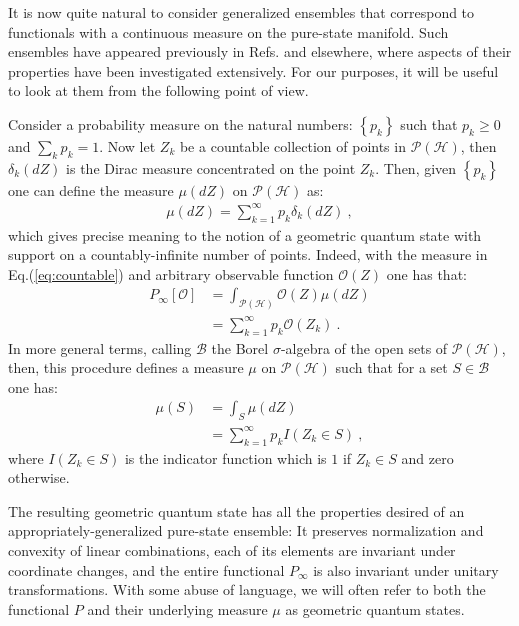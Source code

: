 \documentclass[draft,nofootinbib,pre,twocolumn,showpacs,showkeys,groupaddress,preprintnumbers,floatfix]{revtex4-1}
\newcommand{\1}{\mathbbm{1}}
\newcommand{\PH}{\mathcal{P}(\mathcal{H})}
\begin{document}
It is now quite natural to consider generalized ensembles that correspond to
functionals with a continuous measure on the pure-state manifold. Such ensembles have 
appeared previously in Refs. \cite{Brody2001,Brody2007,Brody1998,Brody2016} and elsewhere, 
where aspects of their properties have been investigated extensively. For our purposes, it will
be useful to look at them from the following point of view.

Consider a probability measure on the natural numbers: $\left\{p_k\right\}$
such that $p_k \geq 0$ and $\sum_k p_k = 1$. Now let $Z_k$ be a countable
collection of points in $\mathcal{P}(\mathcal{H})$, then $\delta_k(dZ)$ is the
Dirac measure concentrated on the point $Z_k$. Then, given $\left\{
p_k\right\}$ one can define the measure $\mu(dZ)$ on $\mathcal{P}(\mathcal{H})$
as:
\begin{align}
\mu(dZ) = \sum_{k=1}^{\infty} p_k \delta_k(dZ) \label{eq:countable}
  ~,
\end{align}
which gives precise meaning to the notion of a geometric quantum state with
support on a countably-infinite number of points. Indeed, with the measure in
Eq.(\ref{eq:countable}) and arbitrary observable function $\mathcal{O}(Z)$ one
has that:
\begin{align*}
P_{\infty}[\mathcal{O} ]
  & = \int_{\PH} \!\!\!\!\!\!\!\!\! \mathcal{O}(Z) \mu(dZ) \\
  & = \sum_{k=1}^{\infty} p_k \mathcal{O}(Z_k) 
  ~.
\end{align*}
In more general terms, calling $\mathcal{B}$ the Borel $\sigma$-algebra of the
open sets of $\PH$, then, this procedure defines a measure $\mu$ on $\PH$ such
that for a set $S \in \mathcal{B}$ one has:
\begin{align*}
\mu(S) & = \int_{S} \mu(dZ) \\
  & =  \sum_{k=1}^{\infty} p_k I(Z_k \in S)
  ~,
\end{align*}
where $I(Z_k \in S)$ is the indicator function which is $1$ if $Z_k \in S$ and
zero otherwise.

The resulting geometric quantum state has all the properties desired of an
appropriately-generalized pure-state ensemble: It preserves normalization and
convexity of linear combinations, each of its elements are invariant under
coordinate changes, and the entire functional $P_\infty$ is also invariant
under unitary transformations. With some abuse of language, we will often refer
to both the functional $P$ and their underlying measure $\mu$ as geometric
quantum states.
\end{document}
